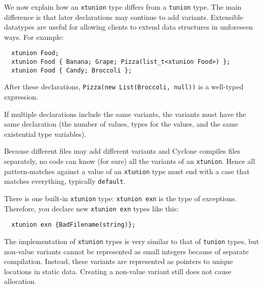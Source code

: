 We now explain how an \texttt{xtunion} type differs from a \texttt{tunion}
type.  The main difference is that later declarations may continue to
add variants.  Extensible datatypes are useful for allowing clients to
extend data structures in unforeseen ways.  For example:
\begin{verbatim}
  xtunion Food;
  xtunion Food { Banana; Grape; Pizza(list_t<xtunion Food>) };
  xtunion Food { Candy; Broccoli };
\end{verbatim}

After these declarations, \texttt{Pizza(new List(Broccoli, null))} is a
well-typed expression.

If multiple declarations include the same variants, the variants must
have the same declaration (the number of values, types for the values,
and the same existential type variables).

Because different files may add different variants and Cyclone
compiles files separately, no code can know (for sure) all the
variants of an \texttt{xtunion}. Hence all pattern-matches against a
value of an \texttt{xtunion} type must end with a case that matches
everything, typically \texttt{default}.

There is one built-in \texttt{xtunion} type: \texttt{xtunion exn} is the
type of exceptions.  Therefore, you declare new \texttt{xtunion exn}
types like this:

\begin{verbatim}
  xtunion exn {BadFilename(string)};
\end{verbatim}

The implementation of \texttt{xtunion} types is very similar to that of
\texttt{tunion} types, but non-value variants cannot be represented as
small integers because of separate compilation.  Instead, these
variants are represented as pointers to unique locations in static
data.  Creating a non-value variant still does not cause allocation.

